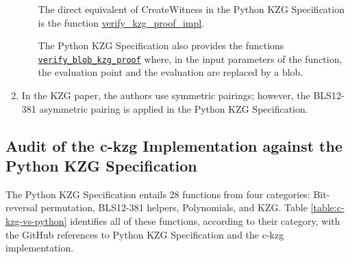 \documentclass[12pt]{galois-whitepaper}
\begin{document}
\begin{enumerate}
\begin{enumerate}
    The direct equivalent of  \textsf{CreateWitness} in the Python KZG Specification is the function \href{https://github.com/ethereum/consensus-specs/blob/dev/specs/deneb/polynomial-commitments.md\#verify_kzg_proof_impl}{verify\_kzg\_proof\_impl}.
    
    The Python KZG Specification also provides the functions \href{https://github.com/ethereum/c-kzg-4844/blob/main/src/eip4844/eip4844.c\#L551}{\texttt{verify\_blob\_kzg\_proof}} where, in the input parameters of the function, the evaluation point and the evaluation are replaced by a blob.

    \end{enumerate}
        

    \item In the KZG paper, the authors use symmetric pairings; however, the BLS12-381 asymmetric pairing is applied in the Python KZG Specification.
\end{enumerate}

\subsection{Audit of the c-kzg Implementation against the Python KZG Specification}

The Python KZG Specification entails 28 functions from four categories: 
Bit-reversal permutation, BLS12-381 helpers, Polynomials, and KZG. 
Table \ref{table:c-kzg-vs-python} identifies all of these functions, according to their category, 
with the GitHub references to Python KZG Specification and the c-kzg implementation. 
\end{document}
